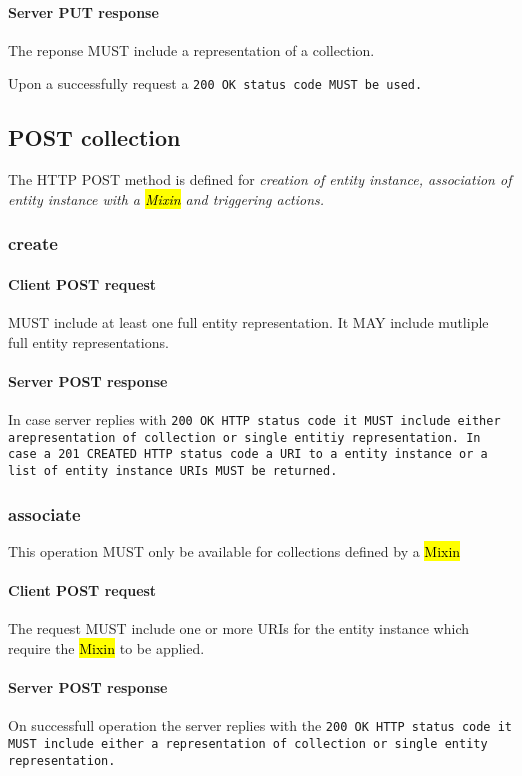 \documentclass[10pt,a4paper]{article}
\begin{document}
\paragraph{Server PUT response}
The reponse MUST include a representation of a collection.

Upon a successfully request a \tt{200 OK} status code MUST be used.

\subsection{POST collection}
The HTTP POST method is defined for \em{creation} of entity instance, \em{association} of entity instance with a \hl{Mixin} and triggering \em{actions}.

\subsubsection{create}

\paragraph{Client POST request}
MUST include at least one full entity representation. It MAY include mutliple full entity representations.

\paragraph{Server POST response}
In case server replies with \tt{200 OK} HTTP status code it MUST include either arepresentation of collection or single entitiy representation. In case a \tt{201 CREATED} HTTP status code a URI to a entity instance or a list of entity instance URIs MUST be returned.

\subsubsection{associate}
This operation MUST only be available for collections defined by a \hl{Mixin}

\paragraph{Client POST request}
The request MUST include one or more URIs for the entity instance which require the \hl{Mixin} to be applied.

\paragraph{Server POST response}
On successfull operation the server replies with the \tt{200 OK} HTTP status code it MUST include either a representation of collection or single entity representation. 
\end{document}
